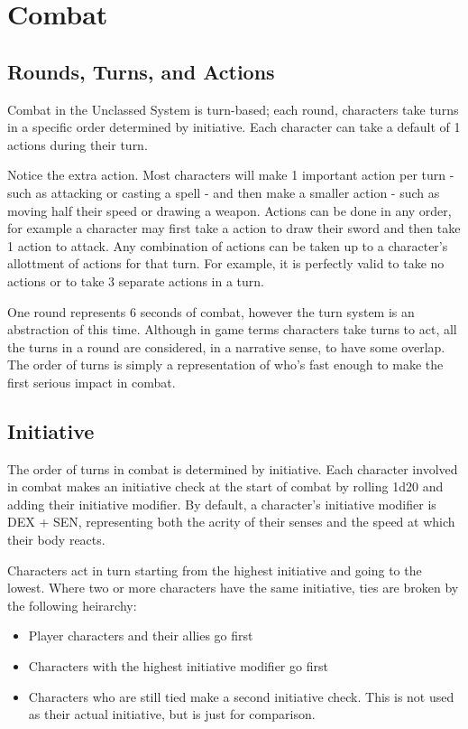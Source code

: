 \chapter{Combat}\label{combat}

\begin{multicols*}{2}

    \section{Rounds, Turns, and Actions}
    Combat in the Unclassed System is turn-based; each round, characters take
    turns in a specific order determined by initiative. Each character can
    take a default of 1 \textonehalf actions during their turn.

    Notice the extra \textonehalf action. Most characters will make 1 important
    action per turn - such as attacking or casting a spell - and then make a
    smaller \textonehalf action - such as moving half their speed or drawing a
    weapon. Actions can be done in any order, for example a character may first
    take a \textonehalf action to draw their sword and then take 1 action to
    attack. Any combination of actions can be taken up to a character's
    allottment of actions for that turn. For example, it is perfectly valid
    to take no actions or to take 3 separate \textonehalf actions in a turn.

    One round represents 6 seconds of combat, however the turn system is an
    abstraction of this time. Although in game terms characters take turns to
    act, all the turns in a round are considered, in a narrative sense, to have
    some overlap. The order of turns is simply a representation of who's fast
    enough to make the first serious impact in combat.

    \section{Initiative}
    The order of turns in combat is determined by initiative. Each character
    involved in combat makes an initiative check at the start of combat by
    rolling 1d20 and adding their initiative modifier. By default, a
    character's initiative modifier is DEX + SEN, representing both the acrity
    of their senses and the speed at which their body reacts.

    Characters act in turn starting from the highest initiative and going to
    the lowest. Where two or more characters have the same initiative, ties
    are broken by the following heirarchy:
    \begin{itemize}
        \item Player characters and their allies go first
        \item Characters with the highest initiative modifier go first
        \item Characters who are still tied make a second initiative check.
            This is not used as their actual initiative, but is just for
            comparison.
    \end{itemize}


\end{multicols*}
